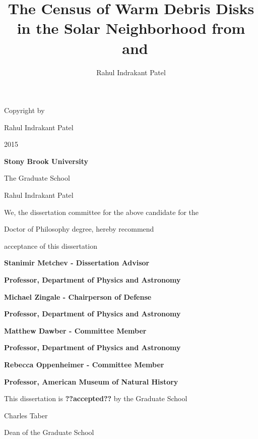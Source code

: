 \documentclass[phd,bottom,nosig]{usbthesis}
\author{Rahul Indrakant Patel}%
\title{The Census of  Warm Debris Disks in the Solar Neighborhood from \WS\ and \hip}%
\begin{document}
\singlespacing %

\maketitle %


\newpage
{}

\vspace*{32\baselineskip}
\vspace*{1\baselineskip}
\centerline{Copyright by}
\centerline{Rahul Indrakant Patel}
\centerline{2015}


\newpage
{}
\setcounter{page}{2}

\centerline{\bf{Stony Brook University}}
\vspace*{1\baselineskip}
\centerline{The Graduate School}
\vspace*{2\baselineskip}
\centerline{Rahul Indrakant Patel}
\vspace*{2\baselineskip}
\centerline{We, the dissertation committee for the above candidate for the}
\vspace*{1\baselineskip}
\centerline{Doctor of Philosophy degree, hereby recommend}
\vspace*{1\baselineskip}
\centerline{acceptance of this dissertation}
\vspace*{2\baselineskip}
\centerline{\bf{Stanimir Metchev - Dissertation Advisor}}
\centerline{\bf{Professor, Department of Physics and Astronomy}}
\vspace*{1\baselineskip}
\centerline{\bf{Michael Zingale - Chairperson of Defense}}
\centerline{\bf{Professor, Department of Physics and Astronomy}}
\vspace*{1\baselineskip}
\centerline{\bf{Matthew Dawber - Committee Member}}
\centerline{\bf{Professor, Department of Physics and Astronomy}}
\vspace*{1\baselineskip}
\centerline{\bf{Rebecca Oppenheimer - Committee Member}}
\centerline{\bf{Professor, American Museum of Natural History}}
\vspace*{2\baselineskip}
\centerline{This dissertation is \textbf{??accepted??} by the Graduate School}
\vspace*{3\baselineskip}
\centerline{Charles Taber}
\centerline{Dean of the Graduate School}

\newpage
\end{document}
